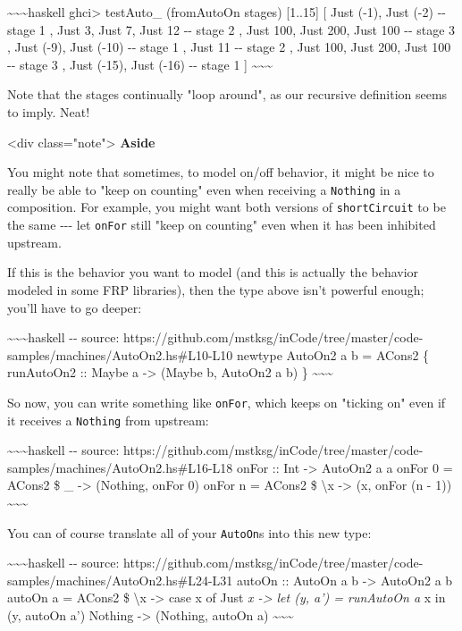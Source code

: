 \documentclass[]{article}
\begin{document}
\textasciitilde{}\textasciitilde{}\textasciitilde{}haskell ghci\textgreater{}
testAuto\_ (fromAutoOn stages) {[}1..15{]} {[} Just (-1), Just (-2) -\/- stage 1
, Just 3, Just 7, Just 12 -\/- stage 2 , Just 100, Just 200, Just 100 -\/- stage
3 , Just (-9), Just (-10) -\/- stage 1 , Just 11 -\/- stage 2 , Just 100, Just
200, Just 100 -\/- stage 3 , Just (-15), Just (-16) -\/- stage 1 {]}
\textasciitilde{}\textasciitilde{}\textasciitilde{}

Note that the stages continually "loop around", as our recursive definition
seems to imply. Neat!

\textless{}div class="note"\textgreater{} \textbf{Aside}

You might note that sometimes, to model on/off behavior, it might be nice to
really be able to "keep on counting" even when receiving a \texttt{Nothing} in a
composition. For example, you might want both versions of \texttt{shortCircuit}
to be the same -\/-\/- let \texttt{onFor} still "keep on counting" even when it
has been inhibited upstream.

If this is the behavior you want to model (and this is actually the behavior
modeled in some FRP libraries), then the type above isn't powerful enough;
you'll have to go deeper:

\textasciitilde{}\textasciitilde{}\textasciitilde{}haskell -\/- source:
https://github.com/mstksg/inCode/tree/master/code-samples/machines/AutoOn2.hs\#L10-L10
newtype AutoOn2 a b = ACons2 \{ runAutoOn2 :: Maybe a -\textgreater{} (Maybe b,
AutoOn2 a b) \} \textasciitilde{}\textasciitilde{}\textasciitilde{}

So now, you can write something like \texttt{onFor}, which keeps on "ticking on"
even if it receives a \texttt{Nothing} from upstream:

\textasciitilde{}\textasciitilde{}\textasciitilde{}haskell -\/- source:
https://github.com/mstksg/inCode/tree/master/code-samples/machines/AutoOn2.hs\#L16-L18
onFor :: Int -\textgreater{} AutoOn2 a a onFor 0 = ACons2 \$ \_ -\textgreater{}
(Nothing, onFor 0) onFor n = ACons2 \$ \textbackslash{}x -\textgreater{} (x,
onFor (n - 1)) \textasciitilde{}\textasciitilde{}\textasciitilde{}

You can of course translate all of your \texttt{AutoOn}s into this new type:

\textasciitilde{}\textasciitilde{}\textasciitilde{}haskell -\/- source:
https://github.com/mstksg/inCode/tree/master/code-samples/machines/AutoOn2.hs\#L24-L31
autoOn :: AutoOn a b -\textgreater{} AutoOn2 a b autoOn a = ACons2 \$
\textbackslash{}x -\textgreater{} case x of Just \emph{x -\textgreater{} let (y,
a') = runAutoOn a }x in (y, autoOn a') Nothing -\textgreater{} (Nothing, autoOn
a) \textasciitilde{}\textasciitilde{}\textasciitilde{}
\end{document}
